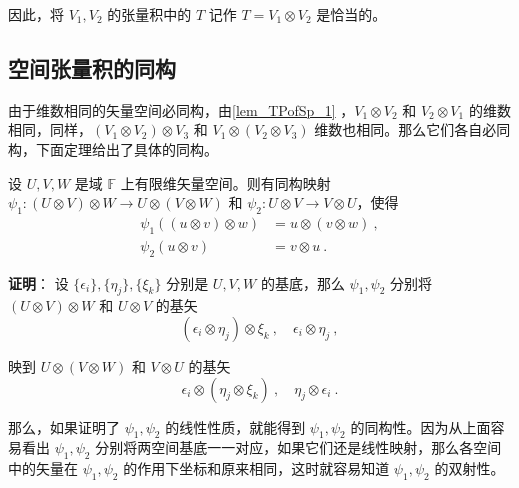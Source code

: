  因此，将 $V_1,V_2$ 的张量积中的 $T$ 记作 $T=V_1\otimes V_2$ 是恰当的。


\subsection{空间张量积的同构}
由于维数相同的矢量空间必同构，由\autoref{lem_TPofSp_1} ，$V_1\otimes V_2$ 和 $V_2\otimes V_1$ 的维数相同，同样，$(V_1\otimes V_2)\otimes V_3$ 和 $V_1\otimes( V_2\otimes V_3)$ 维数也相同。那么它们各自必同构，下面定理给出了具体的同构。
\begin{theorem}{}\label{the_TPofSp_2}
设 $U,V,W$ 是域 $\mathbb F$ 上有限维矢量空间。则有同构映射 $\psi_1:(U\otimes V)\otimes W\rightarrow U\otimes(V\otimes W)$ 和 $\psi_2:U\otimes V\rightarrow V\otimes U$，使得
\begin{equation}
\begin{aligned}
\psi_1((u\otimes v)\otimes w)&=u\otimes(v\otimes w)~,\\
\psi_2(u\otimes v)&=v\otimes u~.
\end{aligned}
\end{equation}
\end{theorem}
\textbf{证明}： 设 $\{\epsilon_i\},\{\eta_j\},\{\xi_k\}$ 分别是 $U,V,W$ 的基底，那么 $\psi_1,\psi_2$ 分别将 $(U\otimes V)\otimes W$ 和 $U\otimes V$ 的基矢
\begin{equation}
(\epsilon_i\otimes\eta_j)\otimes\xi_k~,\quad \epsilon_i\otimes\eta_j~,
\end{equation}

映到 $U\otimes (V\otimes W)$ 和 $V\otimes U$ 的基矢 
\begin{equation}
\epsilon_i\otimes(\eta_j\otimes\xi_k)~,\quad \eta_j\otimes\epsilon_i~.
\end{equation}

那么，如果证明了 $\psi_1,\psi_2$ 的线性性质，就能得到 $\psi_1,\psi_2$ 的同构性。因为从上面容易看出 $\psi_1,\psi_2$ 分别将两空间基底一一对应，如果它们还是线性映射，那么各空间中的矢量在 $\psi_1,\psi_2$ 的作用下坐标和原来相同，这时就容易知道 $\psi_1,\psi_2$ 的双射性。

